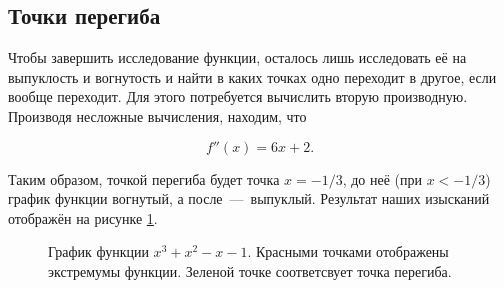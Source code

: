 \documentclass[12pt]{article}
\begin{document}
\subsection{Точки перегиба} %
\label{sec:53}
Чтобы завершить исследование функции, осталось лишь исследовать её на выпуклость и вогнутость и найти в каких точках одно переходит в другое, если вообще переходит. Для этого потребуется вычислить вторую производную. Производя несложные вычисления, находим, что 

\begin{equation}
	f''(x) = 6x + 2.
\end{equation}

Таким образом, точкой перегиба будет точка $x = -1/3$, до неё (при $x< -1/3$) график функции вогнутый, а после~\----~выпуклый. Результат наших изысканий отображён на рисунке \ref{fig:73}.

\begin{figure}[htbp]
	\centering
	\caption{График функции $x^3 + x^2 - x -1$. Красными точками отображены экстремумы функции. Зеленой точке соответсвует точка перегиба.}
	\label{fig:73}
\end{figure}
\end{document}
